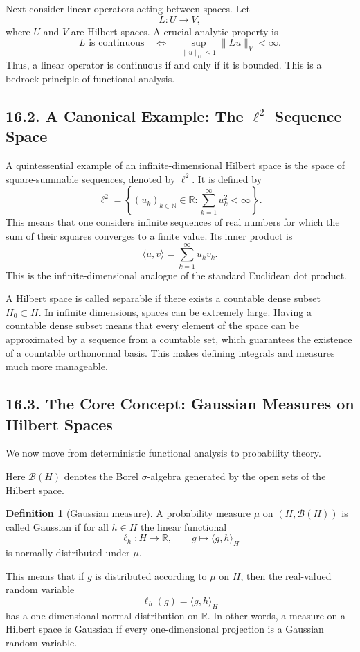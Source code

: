 \documentclass[11pt]{article}
\theoremstyle{definition}
\newtheorem{definition}{Definition}
\theoremstyle{remark}
\begin{document}
Next consider linear operators acting between spaces. Let
\[
L:U\to V,
\]
where $U$ and $V$ are Hilbert spaces. A crucial analytic property is
\[
L \text{ is continuous}
\quad\Longleftrightarrow\quad
\sup_{\|u\|_U\le 1}\|Lu\|_V<\infty.
\]
Thus, a linear operator is continuous if and only if it is bounded. This is a bedrock principle of functional analysis.

\subsection*{16.2. A Canonical Example: The $\ell^2$ Sequence Space}
A quintessential example of an infinite-dimensional Hilbert space is the space of square-summable sequences, denoted by $\ell^2$. It is defined by
\[
\ell^2=\left\{(u_k)_{k\in\mathbb N}\in\mathbb R:\sum_{k=1}^{\infty}u_k^2<\infty\right\}.
\]
This means that one considers infinite sequences of real numbers for which the sum of their squares converges to a finite value. Its inner product is
\[
\langle u,v\rangle=\sum_{k=1}^{\infty}u_kv_k.
\]
This is the infinite-dimensional analogue of the standard Euclidean dot product.

A Hilbert space is called separable if there exists a countable dense subset $H_0\subset H$. In infinite dimensions, spaces can be extremely large. Having a countable dense subset means that every element of the space can be approximated by a sequence from a countable set, which guarantees the existence of a countable orthonormal basis. This makes defining integrals and measures much more manageable.

\subsection*{16.3. The Core Concept: Gaussian Measures on Hilbert Spaces}
We now move from deterministic functional analysis to probability theory.

Here $\mathcal B(H)$ denotes the Borel $\sigma$-algebra generated by the open sets of the Hilbert space.

\begin{definition}[Gaussian measure]
A probability measure $\mu$ on $(H,\mathcal B(H))$ is called Gaussian if for all $h\in H$ the linear functional
\[
\ell_h:H\to\mathbb R,\qquad g\mapsto \langle g,h\rangle_H
\]
is normally distributed under $\mu$.
\end{definition}

This means that if $g$ is distributed according to $\mu$ on $H$, then the real-valued random variable
\[
\ell_h(g)=\langle g,h\rangle_H
\]
has a one-dimensional normal distribution on $\mathbb R$. In other words, a measure on a Hilbert space is Gaussian if every one-dimensional projection is a Gaussian random variable.
\end{document}
